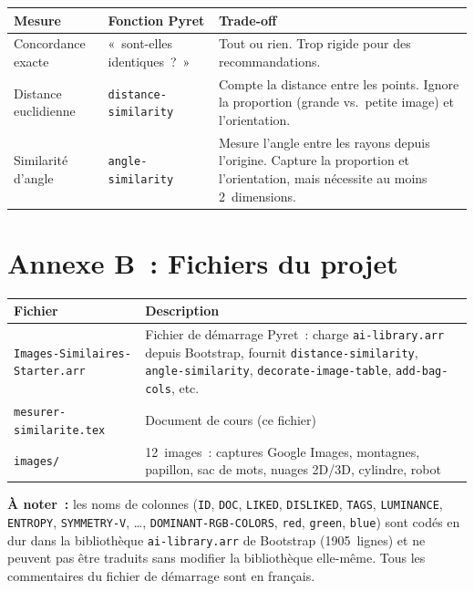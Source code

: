 \documentclass[12pt,a4paper]{article}
\begin{document}
\begin{center}
\begin{tabularx}{\textwidth}{l X X}
  \toprule
  \textbf{Mesure} & \textbf{Fonction Pyret} & \textbf{Trade-off} \\
  \midrule
  Concordance exacte & «~sont-elles identiques~?~» & Tout ou rien. Trop rigide pour des recommandations. \\
  Distance euclidienne & \texttt{distance-similarity} & Compte la distance entre les points. Ignore la proportion (grande vs.\ petite image) et l'orientation. \\
  Similarité d'angle & \texttt{angle-similarity} & Mesure l'angle entre les rayons depuis l'origine. Capture la proportion et l'orientation, mais nécessite au moins 2~dimensions. \\
  \bottomrule
\end{tabularx}
\end{center}

\section*{Annexe B~: Fichiers du projet}

\begin{center}
\begin{tabularx}{\textwidth}{l X}
  \toprule
  \textbf{Fichier} & \textbf{Description} \\
  \midrule
  \texttt{Images\allowbreak-Similaires\allowbreak-Starter.arr} & Fichier de démarrage Pyret~: charge \texttt{ai-library.arr} depuis Bootstrap, fournit \texttt{distance-similarity}, \texttt{angle-similarity}, \texttt{decorate-image-table}, \texttt{add-bag-cols}, etc. \\
  \texttt{mesurer-similarite.tex} & Document de cours (ce fichier) \\
  \texttt{images/} & 12~images~: captures Google Images, montagnes, papillon, sac de mots, nuages 2D/3D, cylindre, robot \\
  \bottomrule
\end{tabularx}
\end{center}

\vspace{1em}
\textbf{À noter~:} les noms de colonnes (\texttt{ID}, \texttt{DOC}, \texttt{LIKED}, \texttt{DISLIKED}, \texttt{TAGS}, \texttt{LUMINANCE}, \texttt{ENTROPY}, \texttt{SYMMETRY-V}, \dots, \texttt{DOMINANT-RGB-COLORS}, \texttt{red}, \texttt{green}, \texttt{blue}) sont codés en dur dans la bibliothèque \texttt{ai-library.arr} de Bootstrap (1905~lignes) et ne peuvent pas être traduits sans modifier la bibliothèque elle-même. Tous les commentaires du fichier de démarrage sont en français.
\end{document}
